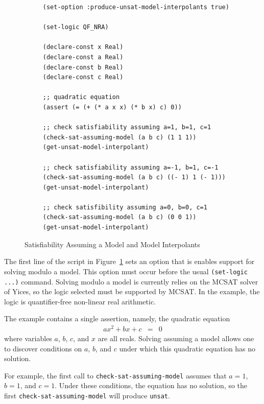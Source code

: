 \documentclass[11pt,twoside,fleqn,openright,titlepage]{cslreport}
\begin{document}
\begin{figure}
\begin{center}
\begin{footnotesize}
\begin{verbatim}
     (set-option :produce-unsat-model-interpolants true)

     (set-logic QF_NRA)

     (declare-const x Real)
     (declare-const a Real)
     (declare-const b Real)
     (declare-const c Real)

     ;; quadratic equation
     (assert (= (+ (* a x x) (* b x) c) 0))

     ;; check satisfiability assuming a=1, b=1, c=1
     (check-sat-assuming-model (a b c) (1 1 1))
     (get-unsat-model-interpolant)

     ;; check satisfiability assuming a=-1, b=1, c=-1
     (check-sat-assuming-model (a b c) ((- 1) 1 (- 1)))
     (get-unsat-model-interpolant)

     ;; check satisfibility assuming a=0, b=0, c=1
     (check-sat-assuming-model (a b c) (0 0 1))
     (get-unsat-model-interpolant)
\end{verbatim}
\end{footnotesize}
\end{center}
\caption{Satisfiability Assuming a Model and Model Interpolants}
\label{model-interpolant}
\end{figure}

\medskip\noindent
The first line of the script in Figure~\ref{model-interpolant} sets an
option that is enables support for solving modulo a model. This option
must occur before the usual \texttt{(set-logic ...)} command. Solving
modulo a model is currently relies on the MCSAT solver of Yices, so
the logic selected must be supported by MCSAT. In the example, the
logic is quantifier-free non-linear real arithmetic.

\medskip\noindent
The example contains a single assertion, namely, the quadratic
equation
\begin{eqnarray*}
  a x^2 + b x + c & = & 0
\end{eqnarray*}
where variables $a$, $b$, $c$, and $x$ are all reals. Solving assuming a model allows one
to discover conditions on $a$, $b$, and $c$ under which this quadratic equation has no solution.

\medskip\noindent For example, the first call to
\texttt{check-sat-assuming-model} assumes that $a=1$,
$b=1$, and $c=1$. Under these conditions, the equation has no
solution, so the first \texttt{check-sat-assuming-model} will produce
\texttt{unsat}.
\end{document}
